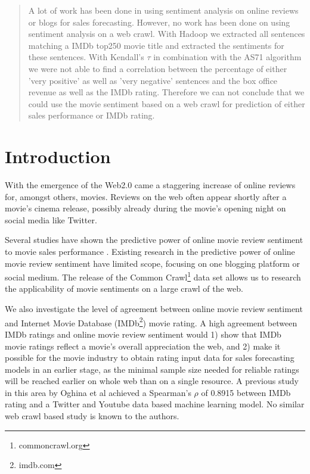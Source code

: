 \documentclass{acm_proc_article-sp}
\begin{document}
\maketitle
\begin{abstract}
A lot of work has been done in using sentiment analysis on online reviews or blogs for sales forecasting. However, no work has been done on using sentiment analysis on a web crawl. With Hadoop we extracted all sentences matching a IMDb top250 movie title and extracted the sentiments for these sentences. With Kendall's $\tau$ in combination with the AS71 algorithm we were not able to find a correlation between the percentage of either 'very positive' as well as 'very negative' sentences and the box office revenue as well as the IMDb rating. Therefore we can not conclude that we could use the movie sentiment based on a web crawl for prediction of either sales performance or IMDb rating.
\end{abstract}




\section{Introduction}
With the emergence of the Web2.0 came a staggering increase of online reviews for, amongst others, movies. Reviews on the web often appear shortly after a movie's cinema release, possibly already during the movie's opening night on social media like Twitter. 

Several studies have shown the predictive power of online movie review sentiment to movie sales performance \cite{Mishne2006, Liu2007, Dellarocas2007, Asur2010, Joshi2010, Yu2012}. Existing research in the predictive power of online movie review sentiment have limited scope, focusing on one blogging platform or social medium. The release of the Common Crawl\footnote{commoncrawl.org} data set allows us to research the applicability of movie sentiments on a large crawl of the web.  

We also investigate the level of agreement between online movie review sentiment and Internet Movie Database (IMDb\footnote{imdb.com}) movie rating. A high agreement between IMDb ratings and online movie review sentiment would 1) show that IMDb movie ratings reflect a movie's overall appreciation the web, and 2) make it possible for the movie industry to obtain rating input data for sales forecasting models in an earlier stage, as the minimal sample size needed for reliable ratings will be reached earlier on whole web than on a single resource. A previous study in this area by Oghina et al \cite{Oghina2012} achieved a Spearman's $\rho$ of 0.8915 between IMDb rating and a Twitter and Youtube data based machine learning model. No similar web crawl based study is known to the authors.
\end{document}

